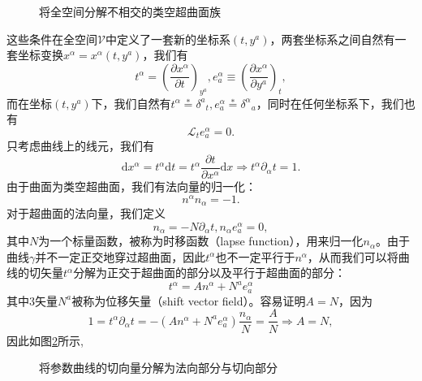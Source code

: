 \documentclass[hyperref, UTF8, a4paper]{ctexart}
\begin{document}
\begin{figure}
	\centering
	
	\caption{将全空间分解不相交的类空超曲面族}
	\label{fig:hypersurface_decompositon}
\end{figure}

这些条件在全空间$\mathscr{V}$中定义了一套新的坐标系$(t,y^{a} )$，两套坐标系之间自然有一套坐标变换$x^{\alpha } =x^{\alpha } (t,y^{a} )$，我们有
\begin{equation*}
	t^{\alpha } =\left(\frac{\partial x^{\alpha }}{\partial t}\right)_{y^{a}} ,e_{a}^{\alpha } \equiv \left(\frac{\partial x^{\alpha }}{\partial y^{a}}\right)_{t} ,
\end{equation*}
而在坐标$(t,y^{a} )$下，我们自然有$t^{\alpha }\stackrel{*}{=} \delta ^{a}{}_{t} ,e_{a}^{\alpha }\stackrel{*}{=} \delta ^{\alpha }{}_{a}$，同时在任何坐标系下，我们也有
\begin{equation*}
	\mathcal{L}_{t} e_{a}^{\alpha } =0.
\end{equation*}
只考虑曲线上的线元，我们有
\begin{equation*}
	\mathrm{d} x^{\alpha } =t^{\alpha }\mathrm{d} t=t^{\alpha }\frac{\partial t}{\partial x^{\alpha }}\mathrm{d} x\Rightarrow t^{\alpha } \partial _{\alpha } t=1.
\end{equation*}
由于曲面为类空超曲面，我们有法向量的归一化：
\begin{equation*}
	n^{\alpha } n_{\alpha } =-1.
\end{equation*}
对于超曲面的法向量，我们定义
\begin{equation*}
	n_{\alpha } =-N\partial _{\alpha } t,n_{\alpha } e_{a}^{\alpha } =0,
\end{equation*}
其中$N$为一个标量函数，被称为时移函数（lapse function），用来归一化$n_{\alpha }$。由于曲线$\gamma $并不一定正交地穿过超曲面，因此$t^{\alpha }$也不一定平行于$n^{\alpha }$，从而我们可以将曲线的切矢量$t^{\alpha }$分解为正交于超曲面的部分以及平行于超曲面的部分：
\begin{equation*}
	t^{\alpha } =An^{\alpha } +N^{a} e_{a}^{\alpha }
\end{equation*}
其中3矢量$N^{a}$被称为位移矢量（shift vector field）。容易证明$A=N$，因为
\begin{equation*}
	1=t^{\alpha } \partial _{\alpha } t=-(An^{\alpha } +N^{a} e_{a}^{\alpha } )\frac{n_{\alpha }}{N} =\frac{A}{N} \Rightarrow A=N,
\end{equation*}
因此如图\ref{fig:lapse_function}所示,

\begin{figure}
	\centering
	
	\caption{将参数曲线的切向量分解为法向部分与切向部分}
	\label{fig:lapse_function}
\end{figure}
\end{document}

